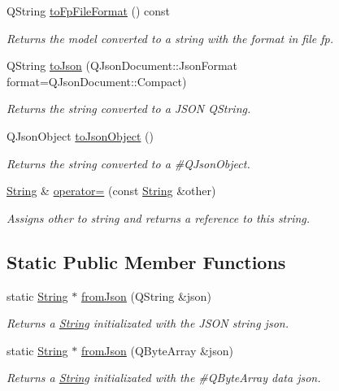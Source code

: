 \begin{DoxyCompactItemize}
Q\+String \mbox{\hyperlink{classString_ab73513e47b7572940944d54963056d07}{to\+Fp\+File\+Format}} () const
\begin{DoxyCompactList}\small\item\em Returns the model converted to a string with the format in file fp. \end{DoxyCompactList}\item 
Q\+String \mbox{\hyperlink{classString_a3dca5b8881d9f531a7ee9bbaf2fff535}{to\+Json}} (Q\+Json\+Document\+::\+Json\+Format format=Q\+Json\+Document\+::\+Compact)
\begin{DoxyCompactList}\small\item\em Returns the string converted to a J\+S\+ON Q\+String. \end{DoxyCompactList}\item 
Q\+Json\+Object \mbox{\hyperlink{classString_a44e35d48e6bf3efe128d3855d242a131}{to\+Json\+Object}} ()
\begin{DoxyCompactList}\small\item\em Returns the string converted to a \#\+Q\+Json\+Object. \end{DoxyCompactList}\item 
\mbox{\hyperlink{classString}{String}} \& \mbox{\hyperlink{classString_a734f34a0b7a42bcad30c368d6e8c5469}{operator=}} (const \mbox{\hyperlink{classString}{String}} \&other)
\begin{DoxyCompactList}\small\item\em Assigns other to string and returns a reference to this string. \end{DoxyCompactList}\end{DoxyCompactItemize}
\subsection*{Static Public Member Functions}
\begin{DoxyCompactItemize}
\item 
static \mbox{\hyperlink{classString}{String}} $\ast$ \mbox{\hyperlink{classString_af406afb78e8dae5e7d2deef41d1f9ed7}{from\+Json}} (Q\+String \&json)
\begin{DoxyCompactList}\small\item\em Returns a \mbox{\hyperlink{classString}{String}} initializated with the J\+S\+ON string json. \end{DoxyCompactList}\item 
static \mbox{\hyperlink{classString}{String}} $\ast$ \mbox{\hyperlink{classString_ab785f3109ff1638b4fb2b052de6cac03}{from\+Json}} (Q\+Byte\+Array \&json)
\begin{DoxyCompactList}\small\item\em Returns a \mbox{\hyperlink{classString}{String}} initializated with the \#\+Q\+Byte\+Array data json. \end{DoxyCompactList}\end{DoxyCompactItemize}
